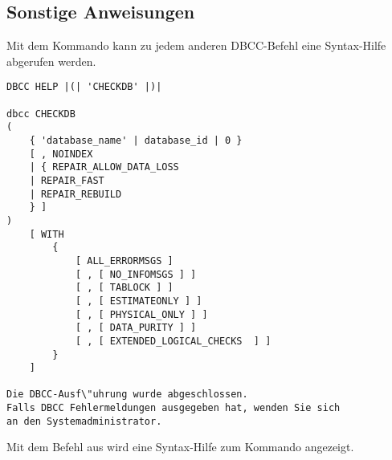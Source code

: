       \subsection{Sonstige Anweisungen}
        Mit dem Kommando  kann zu jedem anderen
        DBCC-Befehl eine Syntax-Hilfe abgerufen werden.
        \begin{lstlisting}[language=ms_sql, caption={DBCC Help - Syntaxhilfe
        aufrufen}, label=admin03_38] 
DBCC HELP |(| 'CHECKDB' |)|

dbcc CHECKDB 
(
    { 'database_name' | database_id | 0 }
    [ , NOINDEX
    | { REPAIR_ALLOW_DATA_LOSS
    | REPAIR_FAST
    | REPAIR_REBUILD
    } ]
)
    [ WITH
        {
            [ ALL_ERRORMSGS ]
            [ , [ NO_INFOMSGS ] ]
            [ , [ TABLOCK ] ]
            [ , [ ESTIMATEONLY ] ]
            [ , [ PHYSICAL_ONLY ] ]
            [ , [ DATA_PURITY ] ]
            [ , [ EXTENDED_LOGICAL_CHECKS  ] ]
        }
    ]

Die DBCC-Ausf\"uhrung wurde abgeschlossen. 
Falls DBCC Fehlermeldungen ausgegeben hat, wenden Sie sich 
an den Systemadministrator.
          \end{lstlisting}          
          Mit dem Befehl aus  wird eine Syntax-Hilfe zum
          Kommando  angezeigt.
          \begin{literaturinternet}
            \item \cite{ms176040}
          \end{literaturinternet}
